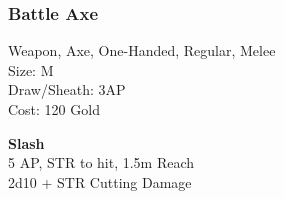 \subsubsection{Battle Axe}\label{weapon:battleaxe}
Weapon, Axe, One-Handed, Regular, Melee\\
Size: M\\
Draw/Sheath: 3AP\\
Cost: 120 Gold

\textbf{Slash}\\
5 AP, STR to hit, 1.5m Reach\\
2d10 + \texttimes STR Cutting Damage
